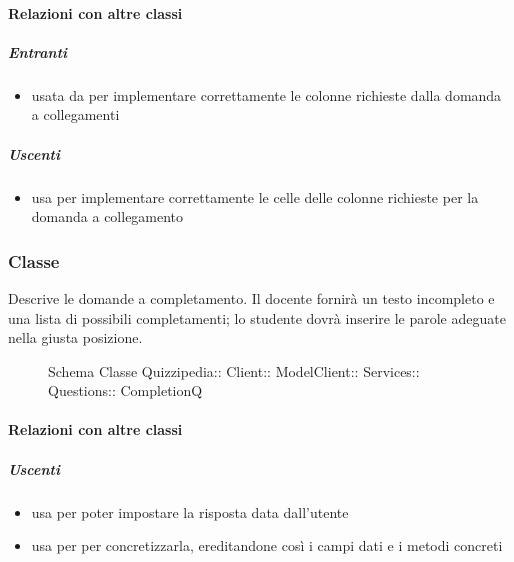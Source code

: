 \paragraph{Relazioni con altre classi}
\subparagraph{Entranti}
\begin{itemize}
\item usata da  per implementare correttamente le colonne richieste dalla domanda a collegamenti
\end{itemize}
\subparagraph{Uscenti}
\begin{itemize}
\item usa  per implementare correttamente le celle delle colonne richieste per la domanda a collegamento
\end{itemize}
\subsubsection{Classe }
Descrive le domande a completamento. Il docente fornirà un testo incompleto e una lista di possibili completamenti; lo studente dovrà inserire le parole adeguate nella giusta posizione.
\begin{figure}[H]
\centering
\noindent{}
\caption[Schema Classe CompletionQ]{Schema Classe Quizzipedia:: Client:: ModelClient:: Services:: Questions:: CompletionQ}
\end{figure}
\paragraph{Relazioni con altre classi}
\subparagraph{Uscenti}
\begin{itemize}
\item usa  per poter impostare la risposta data dall'utente
\item usa  per per concretizzarla, ereditandone così i campi dati e i metodi concreti
\end{itemize}
